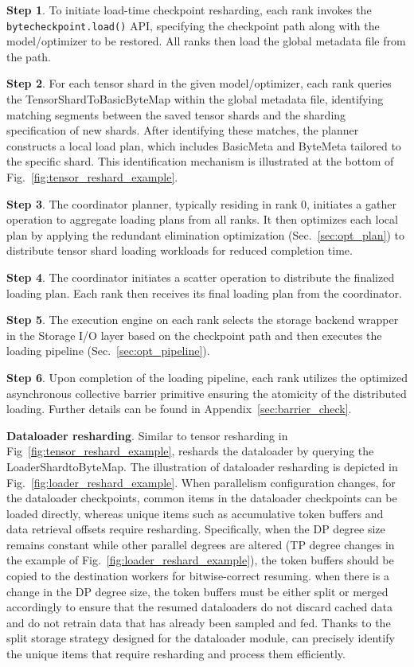 \noindent \textbf{Step 1}.
To initiate load-time checkpoint resharding, each rank invokes the \texttt{bytecheckpoint.load()} API, specifying the checkpoint path along with the model/optimizer
to be restored.
All ranks then load the global metadata file from the 
path.

\noindent \textbf{Step 2}.
For each tensor shard in the given model/optimizer, each rank queries the TensorShardToBasicByteMap within the global metadata file, identifying matching segments between the saved tensor shards and the sharding specification of new shards.
After identifying these matches, the planner constructs a local load plan, which includes BasicMeta and ByteMeta tailored to the specific shard. This identification mechanism is illustrated at the bottom of Fig.~\ref{fig:tensor_reshard_example}.

\noindent \textbf{Step 3}.
The coordinator planner, typically residing in rank 0, initiates a gather operation to aggregate loading plans from all ranks. It then optimizes each local plan by applying the redundant elimination optimization (Sec.~\ref{sec:opt_plan}) to distribute tensor shard loading workloads for reduced completion time.

\noindent \textbf{Step 4}.
The coordinator initiates a scatter operation to distribute the finalized loading plan. Each rank then receives its final loading plan from the coordinator.

\noindent \textbf{Step 5}.
The execution engine on each rank selects the storage backend wrapper in the Storage I/O layer based on the checkpoint path and then executes the loading pipeline (Sec.~\ref{sec:opt_pipeline}).

\noindent \textbf{Step 6}.
Upon completion of the loading pipeline, each rank utilizes the optimized asynchronous collective barrier primitive ensuring the atomicity of the distributed loading. Further details can be found in Appendix~\ref{sec:barrier_check}.

\noindent \textbf{Dataloader resharding}.
Similar to tensor resharding in Fig~\ref{fig:tensor_reshard_example}, \sys{} reshards the dataloader by querying the LoaderShardtoByteMap.
The illustration of dataloader resharding is depicted in Fig.~\ref{fig:loader_reshard_example}. When parallelism configuration changes, for the dataloader checkpoints, common items in the dataloader checkpoints can be loaded directly, whereas unique items such as accumulative token buffers and data retrieval offsets require resharding. Specifically, when the DP degree size remains constant while other parallel degrees are altered (TP degree changes in the example of Fig.~\ref{fig:loader_reshard_example}), the token buffers should be copied to the destination workers for bitwise-correct resuming. when there is a change in the DP degree size, the token buffers must be either split or merged accordingly to ensure that the resumed dataloaders do not discard cached data and do not retrain data that has already been sampled and fed. Thanks to the split storage strategy designed for the dataloader module, \sys{} can precisely identify the unique items that require resharding and process them efficiently.

